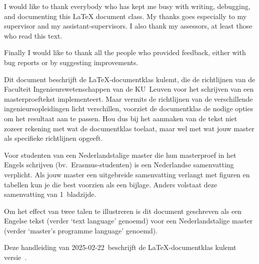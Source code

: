 \documentclass[master=arc,british,oneside]{kulemt}
\newcommand*\manualdate{2025-02-22}
\newcommand*\cls[1]{\textsf{#1}}
\newcommand\English[1]{`\foreignlanguage{english}{#1}'}
\begin{document}
\begin{preface}
  I would like to thank everybody who has kept me busy with writing, debugging,
  and documenting this LaTeX document class. My thanks goes especially to my
  supervisor and my assistant-supervisors. I also thank my assessors, at least
  those who read this text.

  Finally I would like to thank all the people who provided feedback,
  either with bug reports or by suggesting improvements.
\end{preface}

\tableofcontents

\begin{abstract}
  This document describes the use of the LaTeX document class \cls{kulemt},
  which implements the KU~Leuven Faculty of Engineering Science guidelines for
  writing a master's thesis. Since there are slight differences between the
  actual guidelines of the different engineering master's programmes, this
  class implements not only the common part, but it also provides the necessary
  options to adapt it to the specific requirements. So please check the
  guidelines of your master's programme before using or tweaking typesetting
  options.

  To illustrate the difference between the main text language and the master's
  programme language, this document is written in English (as the main text
  language) for a Dutch master's programme.

  This manual (dated \manualdate) describes the \cls{kulemt} class
  version~\classversion.
\end{abstract}

\begin{abstract*}
  Dit document beschrijft de LaTeX-documentklas \cls{kulemt}, die de
  richtlijnen van de Faculteit Ingenieurswetenschappen van de KU~Leuven
  voor het schrijven van een masterproeftekst implementeert. Maar vermits
  de richtlijnen van de verschillende ingenieursopleidingen licht
  verschillen, voorziet de documentklas de nodige opties om het resultaat
  aan te passen. Hou dus bij het aanmaken van de tekst niet zozeer rekening
  met wat de documentklas toelaat, maar wel met wat jouw master als
  specifieke richtlijnen opgeeft.

  Voor studenten van een Nederlandstalige master die hun masterproef in het
  Engels schrijven (bv.\ Erasmus-studenten) is een Nederlandse samenvatting
  verplicht. Als jouw master een uitgebreide samenvatting verlangt met
  figuren en tabellen kun je die best voorzien als een bijlage. Anders
  volstaat deze samenvatting van 1~bladzijde.

  Om het effect van twee talen te illustreren is dit document geschreven
  als een Engelse tekst (verder \English{text language} genoemd) voor een
  Nederlandstalige master (verder \English{master's programme language}
  genoemd).

  Deze handleiding van \manualdate\ beschrijft de LaTeX-documentklas
  \cls{kulemt} versie~\classversion.
\end{abstract*}
\end{document}
